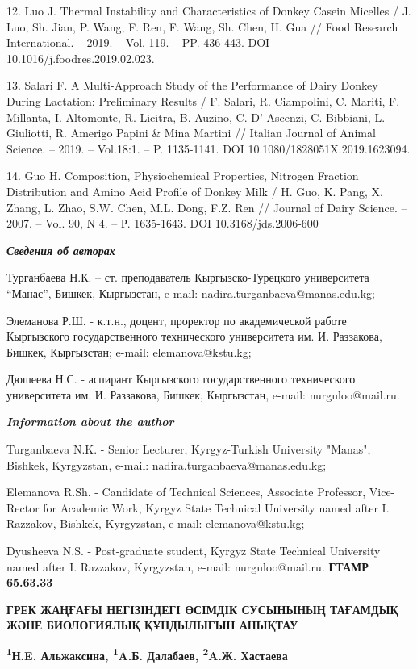 12. Luo J. Thermal Instability and Characteristics of Donkey Casein
Micelles / J. Luo, Sh. Jian, P. Wang, F. Ren, F. Wang, Sh. Chen, H. Gua
// Food Research International. -- 2019. -- Vol. 119. -- PP. 436-443.
DOI 10.1016/j.foodres.2019.02.023.

13. Salari F. A Multi-Approach Study of the Performance of Dairy Donkey
During Lactation: Preliminary Results / F. Salari, R. Ciampolini, C.
Mariti, F. Millanta, I. Altomonte, R. Licitra, B. Auzino, C. D' Ascenzi,
C. Bibbiani, L. Giuliotti, R. Amerigo Papini \& Mina Martini // Italian
Journal of Animal Science. -- 2019. -- Vol.18:1. -- P. 1135-1141. DOI
10.1080/1828051X.2019.1623094.

14. Guo H. Composition, Physiochemical Properties, Nitrogen Fraction
Distribution and Amino Acid Profile of Donkey Milk / H. Guo, K. Pang, X.
Zhang, L. Zhao, S.W. Chen, M.L. Dong, F.Z. Ren // Journal of Dairy
Science. -- 2007. -- Vol. 90, N 4. -- Р. 1635-1643. DOI
10.3168/jds.2006-600

\emph{{\bfseries Сведения об авторах}}

Турганбаева Н.К. -- ст. преподаватель Кыргызско-Турецкого университета
``Манас'', Бишкек, Кыргызстан, e-mail: nadira.turganbaeva@manas.edu.kg;

Элеманова Р.Ш. - к.т.н., доцент, проректор по академической работе
Кыргызского государственного технического университета им. И. Раззакова,
Бишкек, Кыргызстан; e-mail: elemanova@kstu.kg;

Дюшеева Н.С. - аспирант Кыргызского государственного технического
университета им. И. Раззакова, Бишкек, Кыргызстан, e-mail:
nurguloo@mail.ru.

\emph{{\bfseries Information about the author}}

Turganbaeva N.K. - Senior Lecturer, Kyrgyz-Turkish University "Manas",
Bishkek, Kyrgyzstan, e-mail: nadira.turganbaeva@manas.edu.kg;

Elemanova R.Sh. - Candidate of Technical Sciences, Associate Professor,
Vice-Rector for Academic Work, Kyrgyz State Technical University named
after I. Razzakov, Bishkek, Kyrgyzstan, e-mail: elemanova@kstu.kg;

Dyusheeva N.S. - Рost-graduate student, Kyrgyz State Technical
University named after I. Razzakov, Kyrgyzstan, e-mail:
nurguloo@mail.ru.\newpage
{\bfseries ҒТАМР 65.63.33}

{\bfseries ГРЕК ЖАҢҒАҒЫ НЕГІЗІНДЕГІ ӨСІМДІК СУСЫНЫНЫҢ ТАҒАМДЫҚ ЖӘНЕ
БИОЛОГИЯЛЫҚ ҚҰНДЫЛЫҒЫН АНЫҚТАУ}

{\bfseries \textsuperscript{1}Н.E. Альжаксина, \textsuperscript{1}A.Б.
Далабаев, \textsuperscript{2}A.Ж. Хастаева}

